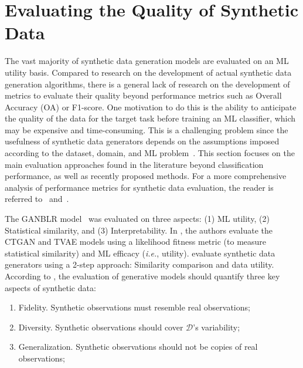 \section{Evaluating the Quality of Synthetic Data
}\label{sec:evaluating-synthetic-data}

The vast majority of synthetic data generation models are evaluated on an ML
utility basis. Compared to research on the development of actual synthetic
data generation algorithms, there is a general lack of research on the
development of metrics to evaluate their quality beyond performance metrics
such as Overall Accuracy (OA) or F1-score.
One motivation to
do this is the ability to anticipate the quality of the data for the target
task before training an ML classifier, which may be expensive and
time-consuming. This is a challenging problem since the usefulness of
synthetic data generators depends on the assumptions imposed according to
the dataset, domain, and ML problem~\cite{chundawat2022tabsyndex}. This
section focuses on the main evaluation approaches found in the literature
beyond classification performance, as well as recently proposed methods. For a
more comprehensive analysis of performance metrics for synthetic data
evaluation, the reader is referred to~\cite{dankar2022multi}
and~\cite{theis2016note}.

The GANBLR model~\cite{zhang2021ganblr} was evaluated on three aspects: (1) ML
utility, (2) Statistical similarity, and (3) Interpretability. In
\cite{xu2019modeling}, the authors evaluate the CTGAN and TVAE models using a
likelihood fitness metric (to measure statistical similarity) and ML efficacy
(\textit{i.e.}, utility). \cite{hittmeir2019utility} evaluate synthetic data
generators using a 2-step approach: Similarity comparison and data utility.
According to \cite{alaa2022faithful}, the evaluation of generative models
should quantify three key aspects of synthetic data:

\begin{enumerate}

    \item Fidelity. Synthetic observations must resemble real
        observations; 

    \item Diversity. Synthetic observations should cover $\mathcal{D}$'s
        variability;

    \item Generalization. Synthetic observations should not be copies of
        real observations;

\end{enumerate}

